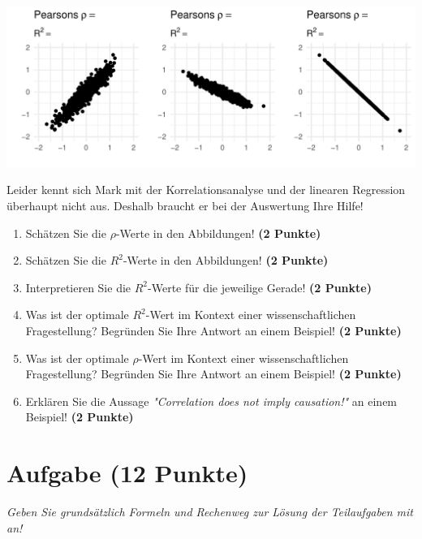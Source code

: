 \documentclass[a4paper, 9pt]{scrartcl}\usepackage[]{graphicx}\usepackage[]{xcolor}
\makeatletter
\def\maxwidth{ %
  \ifdim\Gin@nat@width>\linewidth
    \linewidth
  \else
    \Gin@nat@width
  \fi
}
\makeatother
\begin{document}
{\centering \includegraphics[width=\maxwidth]{img/correlation-02-1} 

}




Leider kennt sich Mark mit der Korrelationsanalyse und der linearen Regression überhaupt nicht aus. Deshalb braucht er bei der Auswertung Ihre Hilfe!

\begin{enumerate}
\item Schätzen Sie die $\rho$-Werte in den Abbildungen! \textbf{(2 Punkte)}
\item Schätzen Sie die $R^2$-Werte in den Abbildungen! \textbf{(2 Punkte)}
\item Interpretieren Sie die $R^2$-Werte für die jeweilige Gerade! \textbf{(2 Punkte)}
\item Was ist der optimale $R^2$-Wert im Kontext einer wissenschaftlichen Fragestellung? Begründen Sie Ihre Antwort an einem Beispiel! \textbf{(2 Punkte)}
\item Was ist der optimale $\rho$-Wert im Kontext einer wissenschaftlichen Fragestellung? Begründen Sie Ihre Antwort an einem Beispiel! \textbf{(2 Punkte)}
\item Erklären Sie die Aussage \textit{"Correlation does not imply causation!"} an einem Beispiel! \textbf{(2 Punkte)}
\end{enumerate} 
\clearpage

\section{Aufgabe \hfill (12 Punkte)}

\textit{Geben Sie grundsätzlich Formeln und Rechenweg zur Lösung der Teilaufgaben mit an!} \\[1Ex]
 
\end{document}
